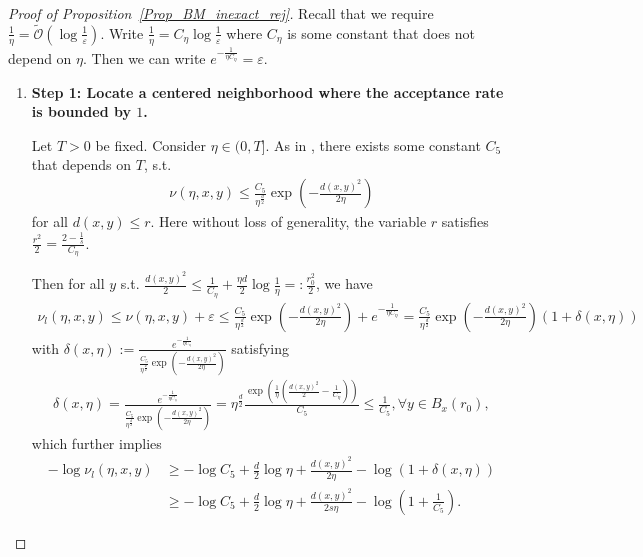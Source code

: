 \begin{proof}[Proof of Proposition~\ref{Prop_BM_inexact_rej}]
    Recall that we require $\frac{1}{\eta} = \tilde{\mathcal{O}}(\log \frac{1}{\varepsilon} )$.
    Write $ \frac{1}{\eta} = C_{\eta}\log \frac{1}{\varepsilon} $ where $C_{\eta}$ is some constant that does not depend on $\eta$.
    Then we can write $e^{- \frac{1}{\eta C_{\eta}}} = \varepsilon$.

    \begin{enumerate}
        \item \textbf{Step 1: Locate a centered neighborhood where the acceptance rate is bounded by $1$. }
        
        Let $T > 0$ be fixed. Consider $\eta \in (0, T]$. 
        As in \citet[Proof of Lemma 5.4.2]{hsu2002stochastic}, there exists some constant $C_{5}$ that depends on $T$, s.t. 
        \begin{align*}
            \nu(\eta, x, y) \le \frac{C_{5}}{\eta^{\frac{d}{2}}} \exp (-\frac{d(x, y)^{2}}{2\eta})
        \end{align*}
        for all $d(x, y) \le r$. 
        Here without loss of generality, the variable $r$ satisfies $\frac{r^{2}}{2} = \frac{2-\frac{1}{s}}{C_{\eta}} $.

        Then for all $y$ s.t. $\frac{d(x, y)^{2}}{2} \le \frac{1}{C_{\eta}} + \frac{\eta d}{2} \log \frac{1}{\eta} =: \frac{ r_{0}^{2}}{2}$, we have 
        \begin{align*}
            \nu_{l}(\eta, x, y) \le \nu(\eta, x, y) + \varepsilon \le \frac{C_{5}}{\eta^{\frac{d}{2}}} \exp (-\frac{d(x, y)^{2}}{2\eta}) + e^{- \frac{1}{\eta C_{\eta}}}
            = \frac{C_{5}}{\eta^{\frac{d}{2}}} \exp (-\frac{d(x, y)^{2}}{2\eta}) (1 + \delta(x, \eta))
        \end{align*}
        with $\delta(x, \eta) := \frac{e^{- \frac{1}{\eta C_{\eta}}}}{\frac{C_{5}}{\eta^{\frac{d}{2}}} \exp (-\frac{d(x, y)^{2}}{2\eta})}$ 
        satisfying
        \begin{align*}
            \delta(x, \eta) = \frac{e^{- \frac{1}{\eta C_{\eta}}}}{\frac{C_{5}}{\eta^{\frac{d}{2}}} \exp (-\frac{d(x, y)^{2}}{2\eta})}
            = \eta^{\frac{d}{2}}\frac{ \exp (\frac{1}{\eta}(\frac{d(x, y)^{2}}{2} - \frac{1}{C_{\eta}}) )}{C_{5} }
            \le \frac{1}{C_{5} }, \forall y \in B_{x}(r_{0}),
        \end{align*}
        which further implies
        \begin{align*}
                - \log \nu_{l}(\eta, x, y) &\ge - \log C_{5} + \frac{d}{2}\log \eta + \frac{d(x, y)^{2}}{2\eta} - \log (1+\delta(x, \eta)) \\
                &\ge - \log C_{5} + \frac{d}{2}\log \eta + \frac{d(x, y)^{2}}{2s\eta} - \log (1+\frac{1}{C_{5} } ).
        \end{align*} 


\end{enumerate}
\end{proof}
